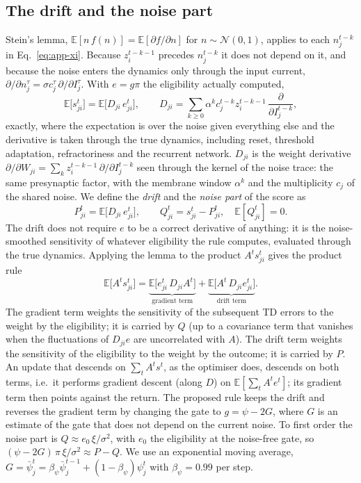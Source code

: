 \documentclass[10pt,twocolumn]{article}
\begin{document}
\subsection{The drift and the noise part}
\label{app:decomp-def}
Stein's lemma, $\mathbb{E}[n\,f(n)]=\mathbb{E}[\partial f/\partial n]$ for
$n\sim\mathcal{N}(0,1)$, applies to each $n^{t-k}_j$ in
Eq.~\eqref{eq:app-xi}. Because $z^{t-k-1}_i$ precedes $n^{t-k}_j$ it does not
depend on it, and because the noise enters the dynamics only through the input
current, $\partial/\partial n^{\tau}_j=\sigma c^\tau_j\,\partial/\partial
I^\tau_j$. With $e=g\pi$ the eligibility actually computed,
\begin{equation}
\mathbb{E}\big[s^t_{ji}\big]=\mathbb{E}\big[D_{ji}\,e^t_{ji}\big],\qquad
D_{ji}=\sum_{k\ge0}\alpha^k c^{t-k}_j z^{t-k-1}_i\,
\frac{\partial}{\partial I^{t-k}_j},
\label{eq:app-stein}
\end{equation}
exactly, where the expectation is over the noise given everything else and the
derivative is taken through the true dynamics, including reset, threshold
adaptation, refractoriness and the recurrent network. $D_{ji}$ is the weight
derivative $\partial/\partial W_{ji}=\sum_k z^{t-k-1}_i\,\partial/\partial
I^{t-k}_j$ seen through the kernel of the noise trace: the same presynaptic
factor, with the membrane window $\alpha^k$ and the multiplicity $c_j$ of the
shared noise. We define the \emph{drift} and the \emph{noise part} of the score
as
\begin{equation}
P^t_{ji}=\mathbb{E}\big[D_{ji}\,e^t_{ji}\big],\qquad
Q^t_{ji}=s^t_{ji}-P^t_{ji},\quad \mathbb{E}[Q^t_{ji}]=0 .
\label{eq:app-PQ}
\end{equation}
The drift does not require $e$ to be a correct derivative of anything: it is the
noise-smoothed sensitivity of whatever eligibility the rule computes, evaluated
through the true dynamics. Applying the lemma to the product $A^t s^t_{ji}$
gives the product rule
\begin{equation}
\mathbb{E}\big[A^t s^t_{ji}\big]=
\underbrace{\mathbb{E}\big[e^t_{ji}\,D_{ji}A^t\big]}_{\text{gradient term}}
+\underbrace{\mathbb{E}\big[A^t\,D_{ji}e^t_{ji}\big]}_{\text{drift term}} .
\label{eq:app-product}
\end{equation}
The gradient term weights the sensitivity of the subsequent TD errors to the
weight by the eligibility; it is carried by $Q$ (up to a covariance term that
vanishes when the fluctuations of $D_{ji}e$ are uncorrelated with $A$). The drift
term weights the sensitivity of the eligibility to the weight by the outcome; it
is carried by $P$. An update that descends on $\sum_t A^t s^t$, as the optimiser
does, descends on both terms, i.e.\ it performs gradient descent (along $D$) on
$\mathbb{E}[\sum_t A^t e^t]$; its gradient term then points against the return.
The proposed rule keeps the drift and reverses the gradient term by changing the
gate to $g=\psi-2G$, where $G$ is an estimate of the gate that does not depend on
the current noise. To first order the noise part is $Q\approx
e_0\,\xi/\sigma^2$, with $e_0$ the eligibility at the noise-free gate, so
$(\psi-2G)\,\pi\,\xi/\sigma^2\approx P-Q$. We use an exponential moving average,
$G=\bar\psi^t_j=\beta_\psi\bar\psi^{t-1}_j+(1-\beta_\psi)\psi^t_j$ with
$\beta_\psi=0.99$ per step.
\end{document}
